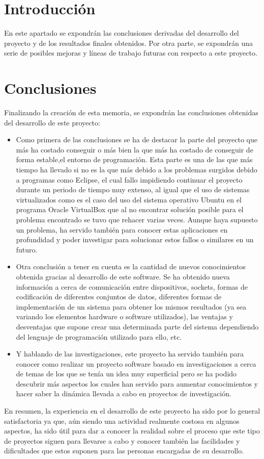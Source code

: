
\section{Introducción}
En este apartado se expondrán las conclusiones derivadas del desarrollo del proyecto y de los resultados finales obtenidos. Por otra parte, se expondrán una serie de posibles mejoras y líneas de trabajo futuras con respecto a este proyecto.

\section{Conclusiones}
Finalizando la creación de esta memoria, se expondrán las conclusiones obtenidas del desarrollo de este proyecto:
\begin{itemize}
	\item Como primera de las conclusiones se ha de destacar la parte del proyecto que más ha costado conseguir o más bien la que más ha costado de conseguir de forma estable,el entorno de programación. Esta parte es una de las que más tiempo ha llevado si no es la que más debido a los problemas surgidos debido a programas como Eclipse, el cual fallo impidiendo continuar el proyecto durante un periodo de tiempo muy extenso, al igual que el uso de sistemas virtualizados como es el caso del uso del sistema operativo Ubuntu en el programa Oracle VirtualBox que al no encontrar solución posible para el problema encontrado se tuvo que rehacer varias veces. Aunque haya supuesto un problema, ha servido también para conocer estas aplicaciones en profundidad y poder investigar para solucionar estos fallos o similares en un futuro.
	\item Otra conclusión a tener en cuenta es la cantidad de nuevos conocimientos obtenida gracias al desarrollo de este software. Se ha obtenido nueva información a cerca de comunicación entre dispositivos, sockets, formas de codificación de diferentes conjuntos de datos, diferentes formas de implementación de un sistema para obtener los mismos resultados (ya sea variando los elementos hardware o software utilizados), las ventajas y desventajas que supone crear una determinada parte del sistema dependiendo del lenguaje de programación utilizado para ello, etc.
	\item Y hablando de las investigaciones, este proyecto ha servido también para conocer como realizar un proyecto software basado en investigaciones a cerca de temas de los que se tenía un idea muy superficial pero se ha podido descubrir más aspectos los cuales han servido para aumentar conocimientos y hacer saber la dinámica llevada a cabo en proyectos de investigación. 
\end{itemize}
En resumen, la experiencia en el desarrollo de este proyecto ha sido por lo general satisfactoria ya que, aún siendo una actividad realmente costosa en algunos aspectos, ha sido útil para dar a conocer la realidad sobre el proceso que este tipo de proyectos siguen para llevarse a cabo y conocer también las facilidades y dificultades que estos suponen para las personas encargadas de su desarrollo.

